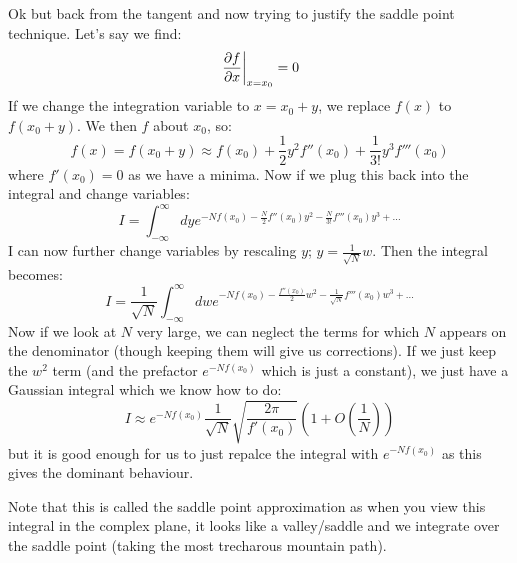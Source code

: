 Ok but back from the tangent and now trying to justify the saddle point technique. Let's say we find:
\begin{equation}
   \left. \frac{\partial f}{\partial x}\right|_{x = x_0} = 0
\end{equation}
If we change the integration variable to $x = x_0 + y$, we replace $f(x)$ to $f(x_0 + y)$. We then $f$ about $x_0$, so:
\begin{equation}
    f(x) = f(x_0 + y) \approx f(x_0) + \frac{1}{2}y^2f''(x_0) + \frac{1}{3!}y^3f'''(x_0)
\end{equation}
where $f'(x_0) = 0$ as we have a minima. Now if we plug this back into the integral and change variables:
\begin{equation}
    I = \int_{-\infty}^\infty dy e^{-Nf(x_0) - \frac{N}{2}f''(x_0)y^2 - \frac{N}{3!}f'''(x_0)y^3 + \ldots}
\end{equation}
I can now further change variables by rescaling $y$; $y = \frac{1}{\sqrt{N}}w$. Then the integral becomes:
\begin{equation}
    I = \frac{1}{\sqrt{N}}\int_{-\infty}^\infty dw e^{-Nf(x_0) - \frac{f''(x_0)}{2}w^2 - \frac{1}{\sqrt{N}}f'''(x_0)w^3 + \ldots}
\end{equation}
Now if we look at $N$ very large, we can neglect the terms for which $N$ appears on the denominator (though keeping them will give us corrections). If we just keep the $w^2$ term (and the prefactor $e^{-Nf(x_0)}$ which is just a constant), we just have a Gaussian integral which we know how to do:
\begin{equation}
    I \approx e^{-Nf(x_0)}\frac{1}{\sqrt{N}}\sqrt{\frac{2\pi}{f'(x_0)}}\left(1 + O(\frac{1}{N})\right)
\end{equation}
but it is good enough for us to just repalce the integral with $e^{-Nf(x_0)}$ as this gives the dominant behaviour.

Note that this is called the saddle point approximation as when you view this integral in the complex plane, it looks like a valley/saddle and we integrate over the saddle point (taking the most trecharous mountain path).

